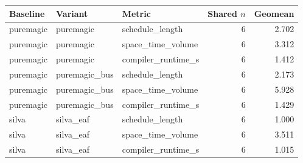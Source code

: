 \begin{tabular}{lllrr}
\hline
Baseline & Variant & Metric & Shared $n$ & Geomean \\
\hline
puremagic & puremagic & schedule\_length & 6 & 2.702 \\
puremagic & puremagic & space\_time\_volume & 6 & 3.312 \\
puremagic & puremagic & compiler\_runtime\_s & 6 & 1.412 \\
puremagic & puremagic\_bus & schedule\_length & 6 & 2.173 \\
puremagic & puremagic\_bus & space\_time\_volume & 6 & 5.928 \\
puremagic & puremagic\_bus & compiler\_runtime\_s & 6 & 1.429 \\
silva & silva\_eaf & schedule\_length & 6 & 1.000 \\
silva & silva\_eaf & space\_time\_volume & 6 & 3.511 \\
silva & silva\_eaf & compiler\_runtime\_s & 6 & 1.015 \\
\hline
\end{tabular}
